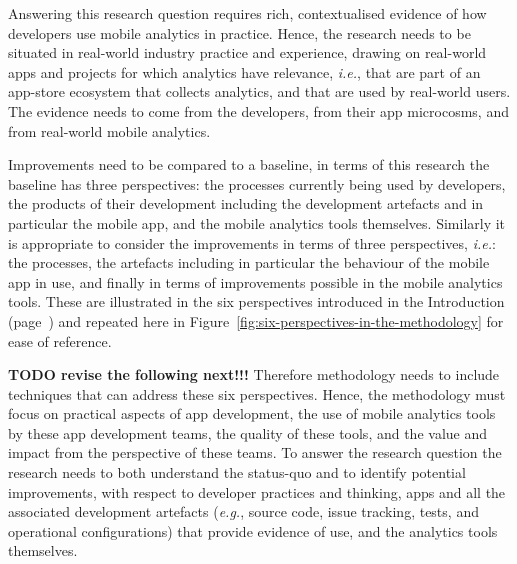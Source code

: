 Answering this research question requires rich, contextualised evidence of how developers use mobile analytics in practice.  Hence, the research needs to be situated in real-world industry practice and experience, drawing on real-world apps and projects for which analytics have relevance, \textit{i.e.}, that are part of an app-store ecosystem that collects analytics, and that are used by real-world users. The evidence needs to come from the developers, from their app microcosms, and from real-world mobile analytics.

Improvements need to be compared to a baseline, in terms of this research the baseline has three perspectives: the processes currently being used by developers, the products of their development including the development artefacts and in particular the mobile app, and the mobile analytics tools themselves. Similarly it is appropriate to consider the improvements in terms of three perspectives, \textit{i.e.}: the processes, the artefacts including in particular the behaviour of the mobile app in use, and finally in terms of improvements possible in the mobile analytics tools. These are illustrated in the six perspectives introduced in the Introduction (page~\pageref{rq-leads-to-six-perspectives}) and repeated here in Figure~\ref{fig:six-perspectives-in-the-methodology} for ease of reference.

\textbf{TODO revise the following next!!!}
Therefore methodology needs to include techniques that can address these six perspectives.  Hence, the methodology must 
focus on practical aspects of app development, the use of mobile analytics tools by these app development teams, the quality of these tools, and the value and impact from the perspective of these teams. To answer the research question the research needs to both understand the status-quo and to identify potential improvements, with respect to developer practices and thinking, apps and all the associated development artefacts (\textit{e.g.}, source code, issue tracking, tests, and operational configurations) that provide evidence of use, and the analytics tools themselves.


